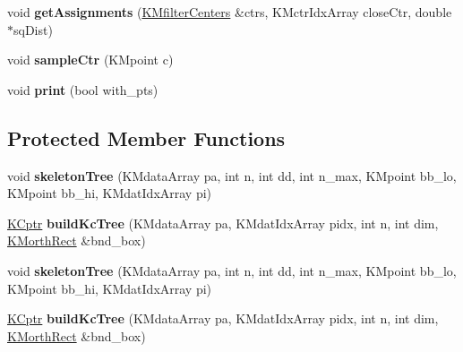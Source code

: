 \begin{DoxyCompactItemize}
\item 
\hypertarget{class_k_ctree_ae71ac7d69549a8131866a5869feeafb1}{
void {\bfseries getAssignments} (\hyperlink{class_k_mfilter_centers}{KMfilterCenters} \&ctrs, KMctrIdxArray closeCtr, double $\ast$sqDist)}
\label{class_k_ctree_ae71ac7d69549a8131866a5869feeafb1}

\item 
\hypertarget{class_k_ctree_ad88615edcc8242c0f436c9d6faa53fe4}{
void {\bfseries sampleCtr} (KMpoint c)}
\label{class_k_ctree_ad88615edcc8242c0f436c9d6faa53fe4}

\item 
\hypertarget{class_k_ctree_aa59495ea7f60cc092d2a0d246396f826}{
void {\bfseries print} (bool with\_\-pts)}
\label{class_k_ctree_aa59495ea7f60cc092d2a0d246396f826}

\end{DoxyCompactItemize}
\subsection*{Protected Member Functions}
\begin{DoxyCompactItemize}
\item 
\hypertarget{class_k_ctree_aa4922e40f47fdef4a0ea0e17adbd378e}{
void {\bfseries skeletonTree} (KMdataArray pa, int n, int dd, int n\_\-max, KMpoint bb\_\-lo, KMpoint bb\_\-hi, KMdatIdxArray pi)}
\label{class_k_ctree_aa4922e40f47fdef4a0ea0e17adbd378e}

\item 
\hypertarget{class_k_ctree_ac602586cf888b32d45e35540379efba5}{
\hyperlink{class_k_cnode}{KCptr} {\bfseries buildKcTree} (KMdataArray pa, KMdatIdxArray pidx, int n, int dim, \hyperlink{class_k_morth_rect}{KMorthRect} \&bnd\_\-box)}
\label{class_k_ctree_ac602586cf888b32d45e35540379efba5}

\item 
\hypertarget{class_k_ctree_aa4922e40f47fdef4a0ea0e17adbd378e}{
void {\bfseries skeletonTree} (KMdataArray pa, int n, int dd, int n\_\-max, KMpoint bb\_\-lo, KMpoint bb\_\-hi, KMdatIdxArray pi)}
\label{class_k_ctree_aa4922e40f47fdef4a0ea0e17adbd378e}

\item 
\hypertarget{class_k_ctree_ac602586cf888b32d45e35540379efba5}{
\hyperlink{class_k_cnode}{KCptr} {\bfseries buildKcTree} (KMdataArray pa, KMdatIdxArray pidx, int n, int dim, \hyperlink{class_k_morth_rect}{KMorthRect} \&bnd\_\-box)}
\label{class_k_ctree_ac602586cf888b32d45e35540379efba5}

\end{DoxyCompactItemize}
